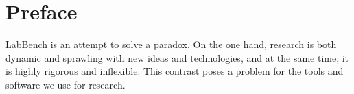 \chapter*{Preface}

LabBench is an attempt to solve a paradox. On the one hand, research is both dynamic and sprawling with new ideas and technologies, and at the same time, it is highly rigorous and inflexible. This contrast poses a problem for the tools and software we use for research. 

